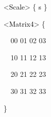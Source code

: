 \documentclass[a4paper]{article}
\newcommand\textstyleOOoComputerKeyWord[1]{\textrm{\textcolor[rgb]{0.0,0.0,0.5019608}{#1}}}
\newcommand\textstyleOOoAssemblerSpecialChar[1]{\textrm{\textcolor[rgb]{0.0,0.5019608,0.0}{#1}}}
\newcommand\textstyleOOoAssemblerIdent[1]{\textrm{\textcolor{black}{#1}}}
\newcommand\textstyleOOoAssemblerLiteral[1]{\textrm{\textcolor[rgb]{0.49803922,0.0,0.49803922}{#1}}}
\begin{document}
{\color{black}
\textstyleOOoComputerKeyWord{\textcolor{black}{\ \ \ \ \ \ }}\textstyleOOoAssemblerSpecialChar{{\textless}}\textstyleOOoAssemblerIdent{Scale}\textstyleOOoAssemblerSpecialChar{{\textgreater}}\textstyleOOoComputerKeyWord{\textcolor{black}{
}}\textstyleOOoAssemblerSpecialChar{\{}\textstyleOOoComputerKeyWord{\textcolor{black}{
}}\textstyleOOoAssemblerIdent{s}\textstyleOOoComputerKeyWord{\textcolor{black}{
}}\textstyleOOoAssemblerSpecialChar{\}}}


\bigskip

{\color{black}
\textstyleOOoComputerKeyWord{\textcolor{black}{\ \ \ \ \ \ }}\textstyleOOoAssemblerSpecialChar{{\textless}}\textstyleOOoAssemblerIdent{Matrix4}\textstyleOOoAssemblerSpecialChar{{\textgreater}}\textstyleOOoComputerKeyWord{\textcolor{black}{
}}\textstyleOOoAssemblerSpecialChar{\{}}

{\color{black}
\textstyleOOoComputerKeyWord{\textcolor{black}{\ \ \ \ \ \ \ \ }}\textstyleOOoAssemblerLiteral{00}\textstyleOOoComputerKeyWord{\textcolor{black}{
}}\textstyleOOoAssemblerLiteral{01}\textstyleOOoComputerKeyWord{\textcolor{black}{
}}\textstyleOOoAssemblerLiteral{02}\textstyleOOoComputerKeyWord{\textcolor{black}{ }}\textstyleOOoAssemblerLiteral{03}}

{\color{black}
\textstyleOOoComputerKeyWord{\textcolor{black}{\ \ \ \ \ \ \ \ }}\textstyleOOoAssemblerLiteral{10}\textstyleOOoComputerKeyWord{\textcolor{black}{
}}\textstyleOOoAssemblerLiteral{11}\textstyleOOoComputerKeyWord{\textcolor{black}{
}}\textstyleOOoAssemblerLiteral{12}\textstyleOOoComputerKeyWord{\textcolor{black}{ }}\textstyleOOoAssemblerLiteral{13}}

{\color{black}
\textstyleOOoComputerKeyWord{\textcolor{black}{\ \ \ \ \ \ \ \ }}\textstyleOOoAssemblerLiteral{20}\textstyleOOoComputerKeyWord{\textcolor{black}{
}}\textstyleOOoAssemblerLiteral{21}\textstyleOOoComputerKeyWord{\textcolor{black}{
}}\textstyleOOoAssemblerLiteral{22}\textstyleOOoComputerKeyWord{\textcolor{black}{ }}\textstyleOOoAssemblerLiteral{23}}

{\color{black}
\textstyleOOoComputerKeyWord{\textcolor{black}{\ \ \ \ \ \ \ \ }}\textstyleOOoAssemblerLiteral{30}\textstyleOOoComputerKeyWord{\textcolor{black}{
}}\textstyleOOoAssemblerLiteral{31}\textstyleOOoComputerKeyWord{\textcolor{black}{
}}\textstyleOOoAssemblerLiteral{32}\textstyleOOoComputerKeyWord{\textcolor{black}{ }}\textstyleOOoAssemblerLiteral{33}}

{\color{black}
\textstyleOOoComputerKeyWord{\textcolor{black}{\ \ \ \ \ \ }}\textstyleOOoAssemblerSpecialChar{\}}}
\end{document}
